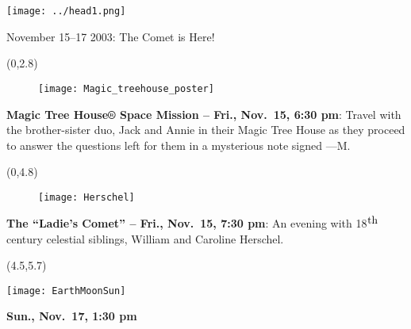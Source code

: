 \documentclass{article}
\begin{document}
\texttt{[image: ../head1.png]}
   {\fontsize{28}{8}
   \begin{centering}

   November 15–17 2003: The Comet is Here!

   \end{centering}
}
   

\begin{textblock}{4.2}(0,2.8)

   {\fontsize{19}{21}

   \begin{wrapfigure}{l}{0.9in}

          \texttt{[image: Magic\_treehouse\_poster]}
       
       \end{wrapfigure}      

       \textbf{Magic Tree House® Space Mission – Fri., Nov.~15, 6:30 pm}: Travel with the brother-sis\-ter duo, 
       Jack and
       Annie in their Magic Tree House as they pro\-ceed to an\-swer the questions left
       for them in a mysterious note signed —M. 
       
       }

\end{textblock}

\begin{textblock}{4.0}(0,4.8)
   \begin{wrapfigure}[12]{l}{2in}
      \texttt{[image: Herschel]}
   \end{wrapfigure}      

   {\fontsize{20}{32}
   \textbf{The “Ladie’s Com\-et” – Fri., Nov.~15, 7:30 pm}:
   An even\-ing with 18$^{\hbox{th}}$ century celestial siblings, Wil\-liam and Caroline
   Herschel. 

   }

\end{textblock}


 \begin{textblock}{3.2}(4.5,5.7)

   {\fontsize{16}{17}

   \texttt{[image: EarthMoonSun]}

   \textbf{Sun., Nov.~17, 1:30 pm}

   }

\end{textblock}
\end{document}
